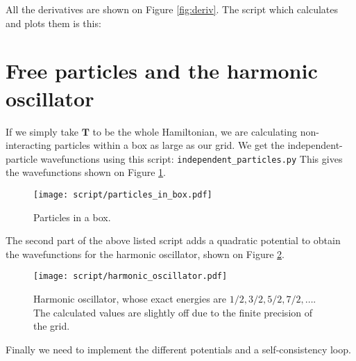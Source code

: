 \documentclass{article}
\begin{document}
\noindent All the derivatives are shown on Figure \ref{fig:deriv}.
The script which calculates and plots them is this:


\section{Free particles and the harmonic oscillator}
If we simply take $\mathbf T$ to be the whole Hamiltonian, we are
calculating
non-interacting particles within a box as large as our grid.
We get the independent-particle wavefunctions using this script:
\lstinline{independent_particles.py}
This gives the wavefunctions shown on Figure \ref{fig:box}.

\begin{figure}
  \texttt{[image: script/particles\_in\_box.pdf]}
  \caption{Particles in a box.}
  \label{fig:box}
\end{figure}

The second part of the above listed script adds a quadratic potential
to obtain the wavefunctions for the harmonic oscillator, shown on Figure
\ref{fig:harmonic}.
\begin{figure}
  \texttt{[image: script/harmonic\_oscillator.pdf]}
  \caption{Harmonic oscillator, whose exact energies are $1/2, 3/2,
    5/2, 7/2, \ldots$.  The calculated values are slightly off due
  to the finite precision of the grid.}
  \label{fig:harmonic}
\end{figure}

Finally we need to implement the different potentials and a
self-consistency loop.


\end{document}
